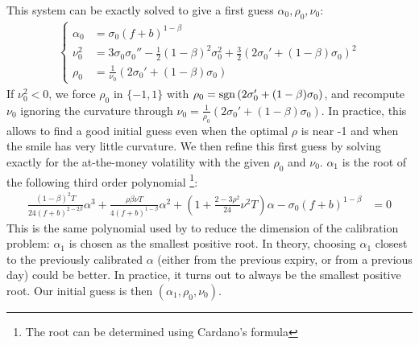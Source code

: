 \documentclass[]{rAMF2e}
\begin{document}
This system can be exactly solved to give a first guess $\alpha_0, \rho_0,\nu_0$:
\begin{align}
  \begin{cases}
\alpha_0 &=  \sigma_0 (f+b)^{1-\beta}\\
\nu_0^2 &= 3\sigma_0\sigma_0''-\frac{1}{2}(1-\beta)^2\sigma_0^2+\frac{3}{2}\left(2\sigma_0'+(1-\beta)\sigma_0\right)^2 \\
\rho_0 &= \frac{1}{\nu_0}\left(2\sigma_0'+(1-\beta)\sigma_0\right) 
\end{cases} 
\end{align}
If $\nu_0^2 < 0$, we force $\rho_0$ in $\lbrace-1,1\rbrace$ with $\rho_0 = \mathop{\mathrm{sgn}}\left(2\sigma_0'+(1-\beta)\sigma_0\right)$, and recompute $\nu_0$ ignoring the curvature through $\nu_0 =\frac{1}{\rho_0}\left(2\sigma_0'+(1-\beta)\sigma_0\right)$. In practice, this allows to find a good initial guess even when the optimal $\rho$ is near -1 and when the smile has very little curvature. We then refine this first guess by solving exactly for the at-the-money volatility with the given $\rho_0$ and $\nu_0$. $\alpha_1$ is the root of the following third order polynomial \footnote{The root can be determined using Cardano's formula}:
\begin{align}
\frac{(1-\beta)^2 T}{24 (f+b)^{2-2\beta}}\alpha^3+ \frac{\rho\beta\nu T}{4(f+b)^{1-\beta}}\alpha^2 + \left(1+\frac{2-3\rho^2}{24}\nu^2 T\right)\alpha - \sigma_0 (f+b)^{1-\beta} &= 0
\end{align}
This is the same polynomial used by \citet{west2005calibration} to reduce the dimension of the calibration problem: $\alpha_1$ is chosen as the smallest positive root. In theory, choosing $\alpha_1$ closest to the previously calibrated $\alpha$ (either from the previous expiry, or from a previous day) could be better. In practice, it turns out to always be the smallest positive root. 
Our initial guess is then $(\alpha_1, \rho_0, \nu_0)$.
\end{document}
